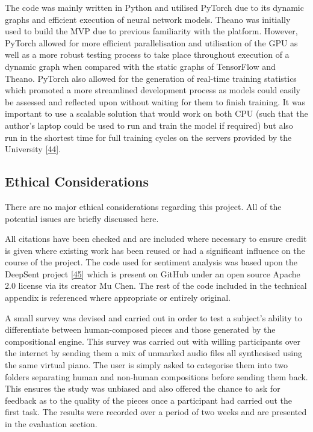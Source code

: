 \documentclass[12pt,]{article}
\begin{document}
The code was mainly written in Python and utilised PyTorch due to its
dynamic graphs and efficient execution of neural network models. Theano
was initially used to build the MVP due to previous familiarity with the
platform. However, PyTorch allowed for more efficient parallelisation
and utilisation of the GPU as well as a more robust testing process to
take place throughout execution of a dynamic graph when compared with
the static graphs of TensorFlow and Theano. PyTorch also allowed for the
generation of real-time training statistics which promoted a more
streamlined development process as models could easily be assessed and
reflected upon without waiting for them to finish training. It was
important to use a scalable solution that would work on both CPU (such
that the author's laptop could be used to run and train the model if
required) but also run in the shortest time for full training cycles on
the servers provided by the University
{[}\protect\hyperlink{ref-warwickcomputenodes}{44}{]}.

\hypertarget{ethical-considerations}{%
\subsection{Ethical Considerations}\label{ethical-considerations}}

There are no major ethical considerations regarding this project. All of
the potential issues are briefly discussed here.

All citations have been checked and are included where necessary to
ensure credit is given where existing work has been reused or had a
significant influence on the course of the project. The code used for
sentiment analysis was based upon the DeepSent project
{[}\protect\hyperlink{ref-deepsent}{45}{]} which is present on GitHub
under an open source Apache 2.0 license via its creator Mu Chen. The
rest of the code included in the technical appendix is referenced where
appropriate or entirely original.

A small survey was devised and carried out in order to test a subject's
ability to differentiate between human-composed pieces and those
generated by the compositional engine. This survey was carried out with
willing participants over the internet by sending them a mix of unmarked
audio files all synthesised using the same virtual piano. The user is
simply asked to categorise them into two folders separating human and
non-human compositions before sending them back. This ensures the study
was unbiased and also offered the chance to ask for feedback as to the
quality of the pieces once a participant had carried out the first task.
The results were recorded over a period of two weeks and are presented
in the evaluation section.
\end{document}
